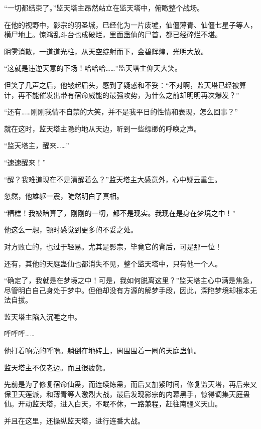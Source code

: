
\begin{this_body}



“一切都结束了。”监天塔主昂然站立在监天塔中，俯瞰整个战场。

在他的视野中，影宗的羽圣城，已经化为一片废墟，仙僵薄青、仙僵七星子等人，横尸地上。惊鸿乱斗台也成破烂，里面蛊仙的尸首，都已经碎烂不堪。

阴雾消散，一道道光柱，从天空绽射而下，金碧辉煌，光明大放。

“这就是违逆天意的下场！哈哈哈……”监天塔主仰天大笑。

但笑了几声之后，他皱起眉头，感到了疑惑和不妥：“不对啊，监天塔已经被算计，再不能催发出带有宿命威能的最强攻势，为什么之前却明明再次爆发？”

“还有……刚刚我情不自禁的大笑，并不是我平日的性情和表现，怎么回事？”

就在这时，监天塔主隐约地从天边，听到一些缥缈的呼唤之声。

“监天塔主，醒来……”

“速速醒来！”

“醒？我难道现在不是清醒着么？”监天塔主大感意外，心中疑云重生。

忽然，他雄躯一震，陡然明白了真相。

“糟糕！我被暗算了，刚刚的一切，都不是现实。我现在是身在梦境之中！”

他这么一想，顿时感觉到更多的不妥之处。

对方败亡的，也过于轻易。尤其是影宗，毕竟它的背后，可是那一位！

还有，其他的天庭蛊仙也都消失不见，整个监天塔中，只有他一个人。

“确定了，我就是在梦境之中！可是，我如何脱离这里？”监天塔主心中满是焦急，尽管明白自己身处于梦中。但他却没有方源的解梦手段，因此，深陷梦境却根本无法自拔。

监天塔主陷入沉睡之中。

呼呼呼……

他打着响亮的呼噜。躺倒在地砖上，周围围着一圈的天庭蛊仙。

监天塔主不仅老迈。而且很疲惫。

先前是为了修复宿命仙蛊，而连续炼蛊，而后又加紧时间，修复监天塔，再后来又保卫天莲派，和薄青等人激烈大战，最后发现影宗的内幕黑手，惊得调集天庭蛊仙。开动监天塔，进入白天，不眠不休，一路兼程，赶往南疆义天山。

并且在这里，还操纵监天塔，进行连番大战。


\end{this_body}
